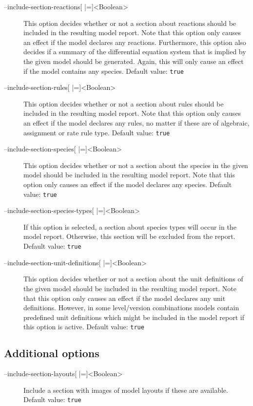 \begin{description}
\item[--include-section-reactions{[} |={]}<Boolean>]
  This option decides whether or not a section about reactions
  should be included in the resulting model report. Note that
  this option only causes an effect if the model declares any
  reactions. Furthermore, this option also decides if a summary
  of the differential equation system that is implied by the given
  model should be generated. Again, this will only cause an effect
  if the model contains any species.
  Default value: \texttt{true}

\item[--include-section-rules{[} |={]}<Boolean>]
  This option decides whether or not a section about rules should
  be included in the resulting model report. Note that this option
  only causes an effect if the model declares any rules, no matter
  if these are of algebraic, assignment or rate rule type.
  Default value: \texttt{true}

\item[--include-section-species{[} |={]}<Boolean>]
  This option decides whether or not a section about the species
  in the given model should be included in the resulting model
  report. Note that this option only causes an effect if the model
  declares any species.
  Default value: \texttt{true}

\item[--include-section-species-types{[} |={]}<Boolean>]
  If this option is selected, a section about species types will
  occur in the model report. Otherwise, this section will be excluded
  from the report.
  Default value: \texttt{true}

\item[--include-section-unit-definitions{[} |={]}<Boolean>]
  This option decides whether or not a section about the unit definitions
  of the given model should be included in the resulting model
  report. Note that this option only causes an effect if the model
  declares any unit definitions. However, in some level/version
  combinations \SBML models contain predefined unit definitions
  which might be included in the model report if this option is
  active.
  Default value: \texttt{true}
\end{description}

\subsection{Additional options}
\begin{description}
\item[--include-section-layouts{[} |={]}<Boolean>]
  Include a section with images of model layouts if these are available.
  Default value: \texttt{true}
\end{description}

